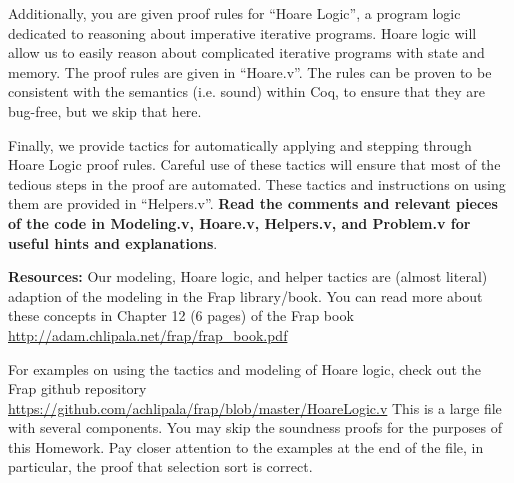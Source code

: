 \documentclass{article}
\begin{document}
Additionally, you are given proof rules for ``Hoare Logic'', a program logic dedicated to reasoning about
imperative iterative programs. Hoare logic will allow us to easily reason about complicated iterative programs
with state and memory. The proof rules are given in ``Hoare.v''. The rules can be proven to be consistent with
the semantics  (i.e. sound) within Coq, to ensure that they are bug-free, but we skip that here.

Finally, we provide tactics for automatically applying and stepping through Hoare Logic proof rules. Careful
use of these tactics will ensure that most of the tedious steps in the proof are automated. These tactics and
instructions on using them are provided in ``Helpers.v''. \textbf{Read the comments and relevant pieces of the code
in Modeling.v, Hoare.v, Helpers.v, and Problem.v for useful hints and explanations}.

\textbf{Resources:} Our modeling, Hoare logic, and helper tactics are (almost literal) adaption of the modeling
in the Frap library/book. You can read more about these concepts in Chapter 12 (6 pages) of the Frap book
\href{http://adam.chlipala.net/frap/frap\_book.pdf}{http://adam.chlipala.net/frap/frap\_book.pdf}

For examples on using the tactics and modeling of Hoare logic, check out the Frap github repository
\href{https://github.com/achlipala/frap/blob/master/HoareLogic.v}{https://github.com/achlipala/frap/blob/master/HoareLogic.v}
This is a large file with several components. You may skip the soundness proofs for the purposes of this Homework. Pay
closer attention to the examples at the end of the file, in particular, the proof that selection sort is correct.
\end{document}

